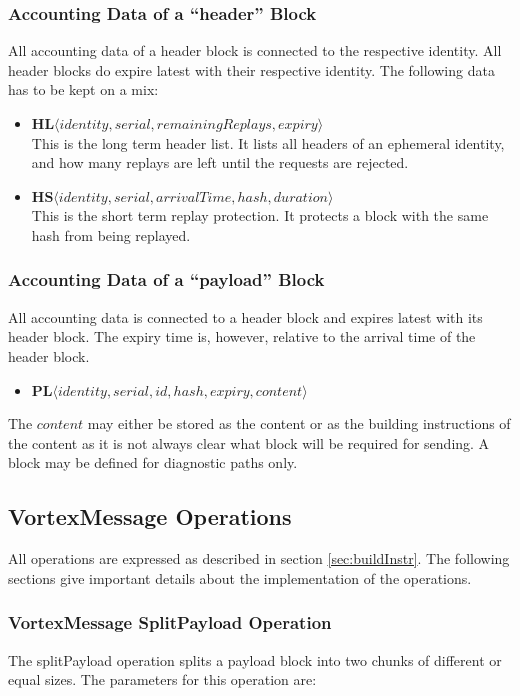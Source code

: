 \subsubsection{Accounting Data of a ``header'' Block}
All accounting data of a header block is connected to the respective identity. All header blocks do expire latest with their respective identity. The following data has to be kept on a mix:
\begin{itemize}
	\item $\mathbf{HL}\langle identity, serial, remainingReplays, expiry\rangle$\\
	This is the long term header list. It lists all headers of an ephemeral identity, and how many replays are left until the requests are rejected.
	\item $\mathbf{HS}\langle identity, serial, arrivalTime, hash, duration \rangle$\\
	This is the short term replay protection. It protects a block with the same hash from being replayed.
\end{itemize}

\subsubsection{Accounting Data of a ``payload'' Block}
All accounting data is connected to a header block and expires latest with its header block. The expiry time is, however, relative to the arrival time of the header block.
\begin{itemize}
	\item $\mathbf{PL}\langle identity, serial, id, hash, expiry, content\rangle$\\
\end{itemize}

The $content$ may either be stored as the content or as the building instructions of the content as it is not always clear what block will be required for sending. A block may be defined for diagnostic paths only.

\subsection{VortexMessage Operations}
All operations are expressed as described in section \ref{sec:buildInstr}. The following sections give important details about the implementation of the operations.

\subsubsection{VortexMessage SplitPayload Operation}
The splitPayload operation splits a payload block into two chunks of different or equal sizes. The parameters for this operation are:


